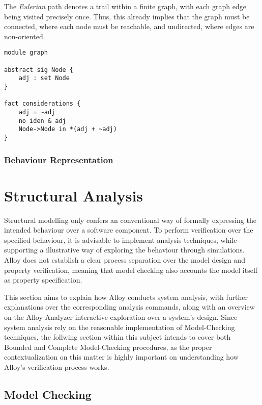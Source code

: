 The \textit{Eulerian} path denotes a trail within a finite graph, with each graph edge being visited precisely once. Thus, this already implies that the graph must be connected, where each node must be reachable, and undirected, where edges are non-oriented. 

\begin{lstlisting}[title={Graph definition.}, otherkeywords = {abstract, sig, module, set, fact, iden, no, in}]
module graph

abstract sig Node {
    adj : set Node
}

fact considerations {
    adj = ~adj
    no iden & adj
    Node->Node in *(adj + ~adj)
}
\end{lstlisting}

\subsubsection{Behaviour Representation}

\section{Structural Analysis}

Structural modelling only confers an conventional way of formally expressing the intended behaviour over a software component. To perform verification over the specified behaviour, it is advisable to implement analysis techniques, while supporting a illustrative way of exploring the behaviour through simulations. Alloy does not establish a clear process separation over the model design and property verification, meaning that model checking also accounts the model itself as property specification.

This section aims to explain how Alloy conducts system analysis, with further explanations over the corresponding analysis commands, along with an overview on the Alloy Analyzer interactive exploration over a system's design. Since system analysis rely on the reasonable implementation of Model-Checking techniques, the follwing section within this subject intends to cover both Bounded and Complete Model-Checking procedures, as the proper contextualization on this matter is highly important on understanding how Alloy's verification process works.

\subsection{Model Checking}

